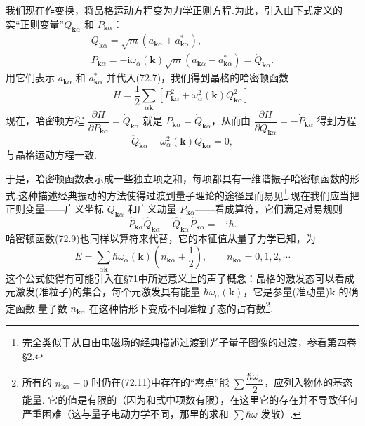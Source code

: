 我们现在作变换，将晶格运动方程变为力学正则方程.为此，引入由下式定义的实“正则变量”$Q_{\boldsymbol{k}\alpha}$ 和 $P_{\boldsymbol{k}\alpha}$：
\begin{equation}
\begin{gathered}
  Q_{\boldsymbol{k}\alpha}=\sqrt{m}\left(a_{\boldsymbol{k}\alpha}+a_{\boldsymbol{k}\alpha}^{*}\right),\\
  P_{\boldsymbol{k}\alpha}=-\mathrm{i}\omega_\alpha(\boldsymbol{k})\sqrt{m}\left(a_{\boldsymbol{k}\alpha}-a_{\boldsymbol{k}\alpha}^{*}\right)=\dot{Q}_{\boldsymbol{k}\alpha}.
\end{gathered}
\end{equation}
用它们表示 $a_{\boldsymbol{k}\alpha}$ 和 $a_{\boldsymbol{k}\alpha}^{*}$ 并代入(72.7)，我们得到晶格的哈密顿函数
\begin{equation}
  H=\frac{1}{2}\sum_{\alpha\boldsymbol{k}}\left[P_{\boldsymbol{k}\alpha}^2+\omega_\alpha^2(\boldsymbol{k})Q_{\boldsymbol{k}\alpha}^2\right].
\end{equation}
现在，哈密顿方程 $\dfrac{\partial H}{\partial P_{\boldsymbol{k}\alpha}}=\dot{Q}_{\boldsymbol{k}\alpha}$ 就是 $P_{\boldsymbol{k}\alpha}=\dot{Q}_{\boldsymbol{k}\alpha}$，从而由 $\dfrac{\partial H}{\partial Q_{\boldsymbol{k}\alpha}}=-\dot{P}_{\boldsymbol{k}\alpha}$ 得到方程
\begin{equation*}
  \ddot{Q}_{\boldsymbol{k}\alpha}+\omega_\alpha^2(\boldsymbol{k})Q_{\boldsymbol{k}\alpha}=0,
\end{equation*}
与晶格运动方程一致.

于是，哈密顿函数表示成一些独立项之和，每项都具有一维谐振子哈密顿函数的形式.这种描述经典振动的方法使得过渡到量子理论的途径显而易见\footnote{完全类似于从自由电磁场的经典描述过渡到光子量子图像的过渡，参看第四卷§2.}.现在我们应当把正则变量——广义坐标 $Q_{\boldsymbol{k}\alpha}$ 和广义动量 $P_{\boldsymbol{k}\alpha}$——看成算符，它们满足对易规则
\begin{equation}
  \hat{P}_{\boldsymbol{k}\alpha}\hat{Q}_{\boldsymbol{k}\alpha}-\hat{Q}_{\boldsymbol{k}\alpha}\hat{P}_{\boldsymbol{k}\alpha}=-\mathrm{i}\hbar.
\end{equation}
哈密顿函数(72.9)也同样以算符来代替，它的本征值从量子力学已知，为
\begin{equation}
  E=\sum_{\alpha\boldsymbol{k}}\hbar\omega_\alpha(\boldsymbol{k})\left(n_{\boldsymbol{k}\alpha}+\frac{1}{2}\right),\qquad
  n_{\boldsymbol{k}\alpha}=0,1,2,\cdots
\end{equation}
这个公式使得有可能引入在§71中所述意义上的声子概念：晶格的激发态可以看成元激发(准粒子)的集合，每个元激发具有能量 $\hbar\omega_\alpha(\boldsymbol{k})$，它是参量(准动量)$\boldsymbol{k}$ 的确定函数.量子数 $n_{\boldsymbol{k}\alpha}$ 在这种情形下变成不同准粒子态的占有数\footnote{所有的 $n_{\boldsymbol{k}\alpha}=0$ 时仍在(72.11)中存在的“零点”能 $\sum\dfrac{\hbar\omega_\alpha}{2}$，应列入物体的基态能量. 它的值是有限的（因为和式中项数有限），在这里它的存在并不导致任何严重困难（这与量子电动力学不同，那里的求和 $\sum\hbar\omega$ 发散）.}.

